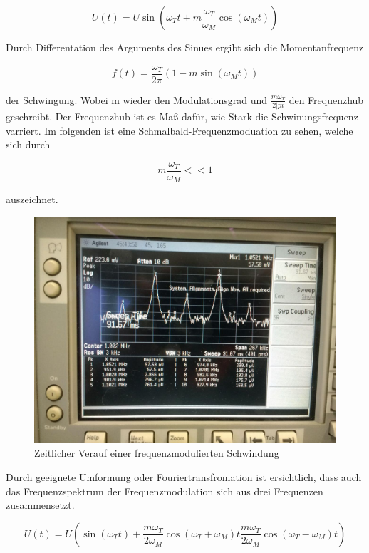 \begin{equation}
U(t)= U\sin(\omega_T t + m \frac{\omega_T}{\omega_M} \cos(\omega_M t))
\label{eq:FreqMod}
\end{equation}

Durch Differentation des Arguments des Sinues ergibt sich die Momentanfrequenz

\begin{equation}
f(t) = \frac{\omega_T}{2\pi}(1-m\sin(\omega_M t))
\label{eq:momFreq}
\end{equation}

der Schwingung. Wobei m wieder den Modulationsgrad und $\frac{m\omega_T}{2|pi}$ den Frequenzhub geschreibt. Der Frequenzhub ist es Maß dafür, wie Stark die Schwinungsfrequenz varriert. Im folgenden ist eine Schmalbald-Frequenzmoduation zu sehen, welche sich durch

\begin{equation}
m\frac{\omega_T}{\omega_M} << 1
\end{equation}

auszeichnet.

\begin{figure}
	\centering
	\includegraphics[width=\textwidth]{img/Aufgabenteil_b.jpg}
	\caption{Zeitlicher Verauf einer frequenzmodulierten Schwindung}
\end{figure}

Durch geeignete Umformung oder Fouriertransfromation ist ersichtlich, dass auch das Frequenzspektrum der Frequenzmodulation sich aus drei
Frequenzen zusammensetzt.

\begin{equation}
U(t) = U(\sin(\omega_T t) + \frac{m\omega_T}{2\omega_M}\cos(\omega_T + \omega_M) t \frac{m\omega_T}{2\omega_M}\cos(\omega_T - \omega_M) t)
\label{eq:FreqFreqMod}
\end{equation}

